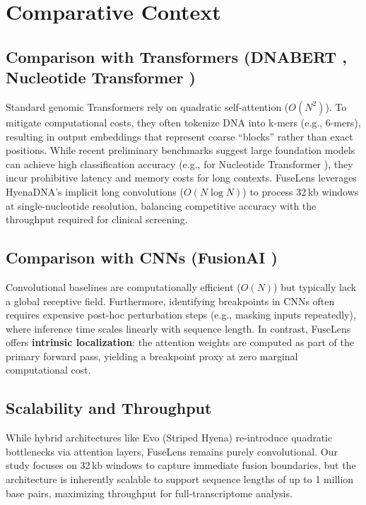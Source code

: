 \documentclass{bioinfo}
\begin{document}
\section{Comparative Context}
\subsection{Comparison with Transformers (DNABERT \cite{dnabert}, Nucleotide Transformer \cite{nucleotide})}
Standard genomic Transformers rely on quadratic self-attention ($O(N^2)$). To mitigate computational costs, they often tokenize DNA into k-mers (e.g., 6-mers), resulting in output embeddings that represent coarse ``blocks'' rather than exact positions. While recent preliminary benchmarks suggest large foundation models can achieve high classification accuracy (e.g., for Nucleotide Transformer \cite{krupicka2025benchmarking}), they incur prohibitive latency and memory costs for long contexts. FuseLens leverages HyenaDNA's implicit long convolutions ($O(N \log N)$) to process 32\,kb windows at single-nucleotide resolution, balancing competitive accuracy with the throughput required for clinical screening.

\subsection{Comparison with CNNs (FusionAI \cite{fusionai})}
Convolutional baselines are computationally efficient ($O(N)$) but typically lack a global receptive field. Furthermore, identifying breakpoints in CNNs often requires expensive post-hoc perturbation steps (e.g., masking inputs repeatedly), where inference time scales linearly with sequence length. In contrast, FuseLens offers \textbf{intrinsic localization}: the attention weights are computed as part of the primary forward pass, yielding a breakpoint proxy at zero marginal computational cost.

\subsection{Scalability and Throughput}
While hybrid architectures like Evo (Striped Hyena) re-introduce quadratic bottlenecks via attention layers, FuseLens remains purely convolutional. Our study focuses on 32\,kb windows to capture immediate fusion boundaries, but the architecture is inherently scalable to support sequence lengths of up to 1 million base pairs, maximizing throughput for full-transcriptome analysis.
\end{document}

